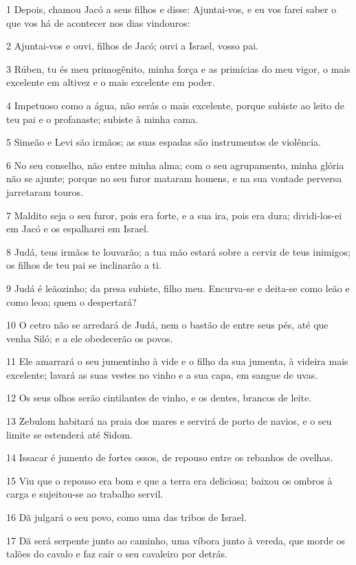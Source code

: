 \par 1 Depois, chamou Jacó a seus filhos e disse: Ajuntai-vos, e eu vos farei saber o que vos há de acontecer nos dias vindouros:
\par 2 Ajuntai-vos e ouvi, filhos de Jacó; ouvi a Israel, vosso pai.
\par 3 Rúben, tu és meu primogênito, minha força e as primícias do meu vigor, o mais excelente em altivez e o mais excelente em poder.
\par 4 Impetuoso como a água, não serás o mais excelente, porque subiste ao leito de teu pai e o profanaste; subiste à minha cama.
\par 5 Simeão e Levi são irmãos; as suas espadas são instrumentos de violência.
\par 6 No seu conselho, não entre minha alma; com o seu agrupamento, minha glória não se ajunte; porque no seu furor mataram homens, e na sua vontade perversa jarretaram touros.
\par 7 Maldito seja o seu furor, pois era forte, e a sua ira, pois era dura; dividi-los-ei em Jacó e os espalharei em Israel.
\par 8 Judá, teus irmãos te louvarão; a tua mão estará sobre a cerviz de teus inimigos; os filhos de teu pai se inclinarão a ti.
\par 9 Judá é leãozinho; da presa subiste, filho meu. Encurva-se e deita-se como leão e como leoa; quem o despertará?
\par 10 O cetro não se arredará de Judá, nem o bastão de entre seus pés, até que venha Siló; e a ele obedecerão os povos.
\par 11 Ele amarrará o seu jumentinho à vide e o filho da sua jumenta, à videira mais excelente; lavará as suas vestes no vinho e a sua capa, em sangue de uvas.
\par 12 Os seus olhos serão cintilantes de vinho, e os dentes, brancos de leite.
\par 13 Zebulom habitará na praia dos mares e servirá de porto de navios, e o seu limite se estenderá até Sidom.
\par 14 Issacar é jumento de fortes ossos, de repouso entre os rebanhos de ovelhas.
\par 15 Viu que o repouso era bom e que a terra era deliciosa; baixou os ombros à carga e sujeitou-se ao trabalho servil.
\par 16 Dã julgará o seu povo, como uma das tribos de Israel.
\par 17 Dã será serpente junto ao caminho, uma víbora junto à vereda, que morde os talões do cavalo e faz cair o seu cavaleiro por detrás.
